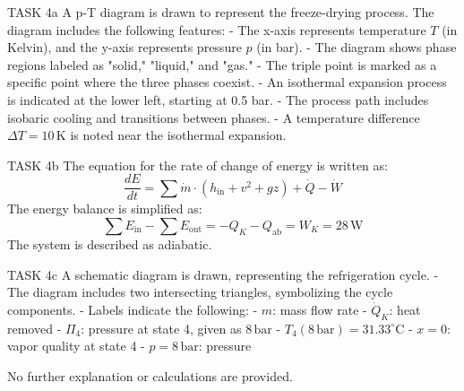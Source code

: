 TASK 4a  
A p-T diagram is drawn to represent the freeze-drying process. The diagram includes the following features:  
- The x-axis represents temperature \( T \) (in Kelvin), and the y-axis represents pressure \( p \) (in bar).  
- The diagram shows phase regions labeled as "solid," "liquid," and "gas."  
- The triple point is marked as a specific point where the three phases coexist.  
- An isothermal expansion process is indicated at the lower left, starting at 0.5 bar.  
- The process path includes isobaric cooling and transitions between phases.  
- A temperature difference \( \Delta T = 10 \, \text{K} \) is noted near the isothermal expansion.  

TASK 4b  
The equation for the rate of change of energy is written as:  
\[
\frac{dE}{dt} = \sum \dot{m} \cdot (h_{\text{in}} + v^2 + gz) + \dot{Q} - \dot{W}
\]  
The energy balance is simplified as:  
\[
\sum E_{\text{in}} - \sum E_{\text{out}} = -Q_K - Q_{\text{ab}} = W_K = 28 \, \text{W}
\]  
The system is described as adiabatic.  

TASK 4c  
A schematic diagram is drawn, representing the refrigeration cycle.  
- The diagram includes two intersecting triangles, symbolizing the cycle components.  
- Labels indicate the following:  
  - \( m \): mass flow rate  
  - \( \dot{Q}_K \): heat removed  
  - \( \Pi_4 \): pressure at state 4, given as \( 8 \, \text{bar} \)  
  - \( T_4(8 \, \text{bar}) = 31.33^\circ\text{C} \)  
  - \( x = 0 \): vapor quality at state 4  
  - \( p = 8 \, \text{bar} \): pressure  

No further explanation or calculations are provided.
